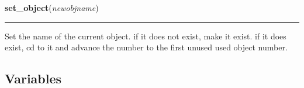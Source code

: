     \vspace{0.5ex}

    \begin{boxedminipage}{\textwidth}

    \raggedright \textbf{set\_object}(\textit{newobjname})

    \vspace{-1.5ex}

    \rule{\textwidth}{0.5\fboxrule}
    Set the name of the current object. if it does not exist, make it 
    exist. if it does exist, cd to it and advance the number to the first 
    unused used object number.

    \vspace{1ex}

    \end{boxedminipage}



  \subsection{Variables}

